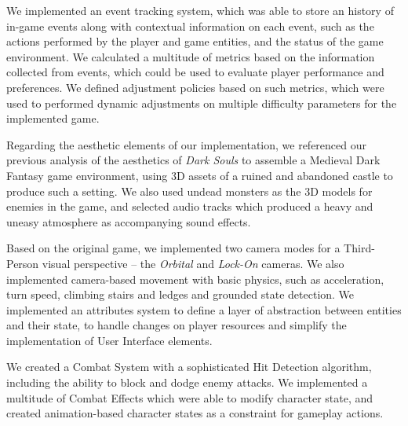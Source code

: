 We implemented an event tracking system, which was able to store an history of in-game events along with contextual information on each event, such as the actions performed by the player and game entities, and the status of the game environment. We calculated a multitude of metrics based on the information collected from events, which could be used to evaluate player performance and preferences. We defined adjustment policies based on such metrics, which were used to performed dynamic adjustments on multiple difficulty parameters for the implemented game.

Regarding the aesthetic elements of our implementation, we referenced our previous analysis of the aesthetics of \emph{Dark Souls} to assemble a Medieval Dark Fantasy game environment, using 3D assets of a ruined and abandoned castle to produce such a setting. We also used undead monsters as the 3D models for enemies in the game, and selected audio tracks which produced a heavy and uneasy atmosphere as accompanying sound effects. 

Based on the original game, we implemented two camera modes for a Third-Person visual perspective -- the \emph{Orbital} and \emph{Lock-On} cameras. We also implemented camera-based movement with basic physics, such as acceleration, turn speed, climbing stairs and ledges and grounded state detection. We implemented an attributes system to define a layer of abstraction between entities and their state, to handle changes on player resources and simplify the implementation of User Interface elements.

We created a Combat System with a sophisticated Hit Detection algorithm, including the ability to block and dodge enemy attacks. We implemented a multitude of Combat Effects which were able to modify character state, and created animation-based character states as a constraint for gameplay actions.

